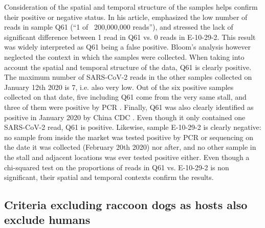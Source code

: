 \documentclass[11pt]{article}
\def \sct {\mbox{SARS-CoV-2}}
\begin{document}
Consideration of the spatial and temporal structure of the samples helps confirm their positive or negative status. In his article, \citet{Bloom2023VE} emphasized the low number of reads in sample Q61 (``1 of ~200,000,000 reads''), and stressed the lack of significant difference between 1 read in Q61 vs. 0 reads in E-10-29-2. This result was widely interpreted as Q61 being a false positive. Bloom's analysis however neglected the context in which the samples were collected. When taking into account the spatial and temporal structure of the data, Q61 is clearly positive. The maximum number of \sct{} reads in the other samples collected on January 12th 2020 is 7, i.e. also very low. Out of the six positive samples collected on that date, five including Q61 come from the very same stall, and three of them were positive by PCR \citep{ACC2023bioRxiv}. Finally, Q61 was also clearly identified as positive in January 2020 by China CDC \citep{Wu2020CCDC}. Even though it only contained one \sct{} read, Q61 is positive. Likewise, sample E-10-29-2 is clearly negative: no sample from inside the market was tested positive by PCR or sequencing on the date it was collected (February 20th 2020) nor after, and no other sample in the stall and adjacent locations was ever tested positive either. Even though a chi-squared test on the proportions of reads in Q61 vs. E-10-29-2 is non significant, their spatial and temporal contexts confirm the results. 

\subsection{Criteria excluding raccoon dogs as hosts also exclude humans}
\end{document}
